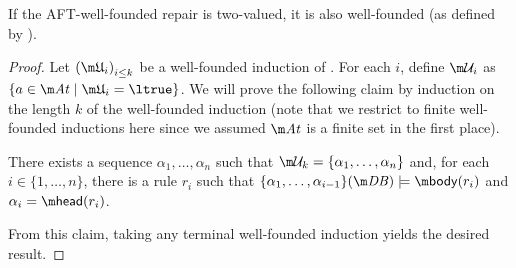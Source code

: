 \begin{proposition}\label{prop:wf-wf}
 If the AFT-well-founded repair is two-valued,  it is also well-founded (as defined by \citet{}). 
\end{proposition}
\begin{proof}
Let $\left(\UUU_i\right)_{i\leq k}$ be a well-founded induction of \Ap. 
For each $i$, define $\UU_i$ as $\{a \in \atoms \mid \UUU_i=\ltrue\}$. 
We will prove the following claim by induction on the length $k$ of the well-founded induction (note that we restrict to finite well-founded inductions here since we assumed $\atoms$ is a finite set in the first place). 

There exists a sequence $\alpha_1,\dots,\alpha_n$ such that $\UU_k=\{\alpha_1,\dots,\alpha_n\}$ and, for each $i\in\{1,\dots,n\}$, there is a rule $r_i$ such that $\{\alpha_1,\dots,\alpha_{i-1}\}(\db) \models \body (r_i)$ and $\alpha_i = \head(r_i)$.

From this claim, taking any terminal well-founded induction yields the desired result. 


\end{proof}
